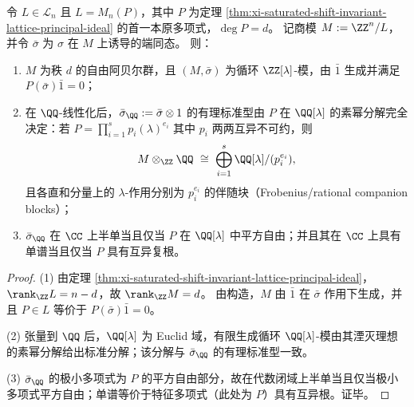 \begin{theorem}\label{thm:xi-syndrome-quotient-module-rational-canonical-fingerprint}
令 \(L\in\mathcal L_n\) 且 \(L=M_n(P)\)，其中 \(P\) 为定理 \ref{thm:xi-saturated-shift-invariant-lattice-principal-ideal} 的首一本原多项式，\(\deg P=d\)。
记商模
\(
M:=\ZZ^n/L
\)，并令 \(\bar\sigma\) 为 \(\sigma\) 在 \(M\) 上诱导的端同态。
则：
\begin{enumerate}
  \item \(M\) 为秩 \(d\) 的自由阿贝尔群，且 \((M,\bar\sigma)\) 为循环 \(\ZZ[\lambda]\)-模，由 \(\bar 1\) 生成并满足 \(P(\bar\sigma)\bar 1=0\)；
  \item 在 \(\QQ\)-线性化后，\(\bar\sigma_{\QQ}:=\bar\sigma\otimes 1\) 的有理标准型由 \(P\) 在 \(\QQ[\lambda]\) 的素幂分解完全决定：若
        \(
        P=\prod_{i=1}^s p_i(\lambda)^{e_i}
        \)
        其中 \(p_i\) 两两互异不可约，则
        \[
        M\otimes_{\ZZ}\QQ\ \cong\ \bigoplus_{i=1}^{s}\QQ[\lambda]/(p_i^{e_i}),
        \]
        且各直和分量上的 \(\lambda\)-作用分别为 \(p_i^{e_i}\) 的伴随块（Frobenius/rational companion blocks）；
  \item \(\bar\sigma_{\QQ}\) 在 \(\CC\) 上半单当且仅当 \(P\) 在 \(\QQ[\lambda]\) 中平方自由；并且其在 \(\CC\) 上具有单谱当且仅当 \(P\) 具有互异复根。
\end{enumerate}
\end{theorem}
\begin{proof}
(1) 由定理 \ref{thm:xi-saturated-shift-invariant-lattice-principal-ideal}，\(\rank_{\ZZ}L=n-d\)，故 \(\rank_{\ZZ}M=d\)。
由构造，\(M\) 由 \(\bar 1\) 在 \(\bar\sigma\) 作用下生成，并且 \(P\in L\) 等价于 \(P(\bar\sigma)\bar 1=0\)。
\par
(2) 张量到 \(\QQ\) 后，\(\QQ[\lambda]\) 为 Euclid 域，有限生成循环 \(\QQ[\lambda]\)-模由其湮灭理想的素幂分解给出标准分解；该分解与 \(\bar\sigma_{\QQ}\) 的有理标准型一致。
\par
(3) \(\bar\sigma_{\QQ}\) 的极小多项式为 \(P\) 的平方自由部分，故在代数闭域上半单当且仅当极小多项式平方自由；单谱等价于特征多项式（此处为 \(P\)）具有互异根。证毕。
\end{proof}

\endinput

